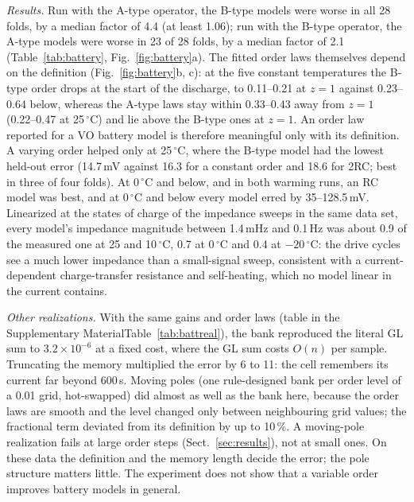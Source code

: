 \emph{Results.} Run with the A-type operator, the B-type models were worse in all 28 folds, by a median factor of 4.4 (at least 1.06); run with the B-type operator, the A-type models were worse in 23 of 28 folds, by a median factor of 2.1 (Table~\ref{tab:battery}, Fig.~\ref{fig:battery}a). The fitted order laws themselves depend on the definition (Fig.~\ref{fig:battery}b, c): at the five constant temperatures the B-type order drops at the start of the discharge, to 0.11--0.21 at $z=1$ against 0.23--0.64 below, whereas the A-type laws stay within 0.33--0.43 away from $z=1$ (0.22--0.47 at 25\,$^\circ$C) and lie above the B-type ones at $z=1$. An order law reported for a VO battery model is therefore meaningful only with its definition. A varying order helped only at 25\,$^\circ$C, where the B-type model had the lowest held-out error (14.7\,mV against 16.3 for a constant order and 18.6 for 2RC; best in three of four folds). At 0\,$^\circ$C and below, and in both warming runs, an RC model was best, and at 0\,$^\circ$C and below every model erred by 35--128.5\,mV. Linearized at the states of charge of the impedance sweeps in the same data set, every model's impedance magnitude between 1.4\,mHz and 0.1\,Hz was about 0.9 of the measured one at 25 and 10\,$^\circ$C, 0.7 at 0\,$^\circ$C and 0.4 at $-20\,^\circ$C: the drive cycles see a much lower impedance than a small-signal sweep, consistent with a current-dependent charge-transfer resistance and self-heating, which no model linear in the current contains.

\ifsp\else\fi
\emph{Other realizations.} With the same gains and order laws (\ifsp table in the Supplementary Material\else Table~\ref{tab:battreal}\fi), the bank reproduced the literal GL sum to $3.2\times10^{-6}$ at a fixed cost, where the GL sum costs $O(n)$ per sample. Truncating the memory multiplied the error by 6 to 11: the cell remembers its current far beyond 600\,s. Moving poles (one rule-designed bank per order level of a 0.01 grid, hot-swapped) did almost as well as the bank here, because the order laws are smooth and the level changed only between neighbouring grid values; the fractional term deviated from its definition by up to 10\,\%. A moving-pole realization fails at large order steps (Sect.~\ref{sec:results}), not at small ones. On these data the definition and the memory length decide the error; the pole structure matters little. The experiment does not show that a variable order improves battery models in general.

